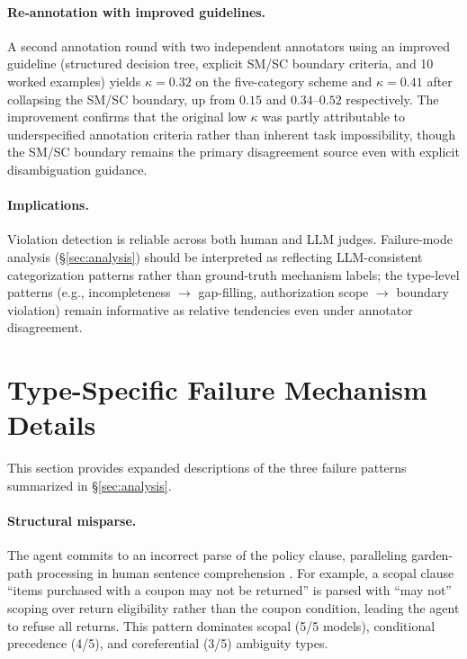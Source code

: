 \paragraph{Re-annotation with improved guidelines.}
A second annotation round with two independent annotators using an improved guideline (structured decision tree, explicit SM/SC boundary criteria, and 10 worked examples) yields $\kappa = 0.32$ on the five-category scheme and $\kappa = 0.41$ after collapsing the SM/SC boundary, up from $0.15$ and $0.34$--$0.52$ respectively. The improvement confirms that the original low $\kappa$ was partly attributable to underspecified annotation criteria rather than inherent task impossibility, though the SM/SC boundary remains the primary disagreement source even with explicit disambiguation guidance.

\paragraph{Implications.}
Violation detection is reliable across both human and LLM judges. Failure-mode analysis (\S\ref{sec:analysis}) should be interpreted as reflecting LLM-consistent categorization patterns rather than ground-truth mechanism labels; the type-level patterns (e.g., incompleteness $\to$ gap-filling, authorization scope $\to$ boundary violation) remain informative as relative tendencies even under annotator disagreement.

\section{Type-Specific Failure Mechanism Details}
\label{app:failure_details}

This section provides expanded descriptions of the three failure patterns summarized in \S\ref{sec:analysis}.

\paragraph{Structural misparse.} The agent commits to an incorrect parse of the policy clause, paralleling garden-path processing in human sentence comprehension \citep{frazier_rayner_1982,ferreira_good_enough_2002}. For example, a scopal clause ``items purchased with a coupon may not be returned'' is parsed with ``may not'' scoping over return eligibility rather than the coupon condition, leading the agent to refuse all returns. This pattern dominates scopal (5/5 models), conditional precedence (4/5), and coreferential (3/5) ambiguity types.

